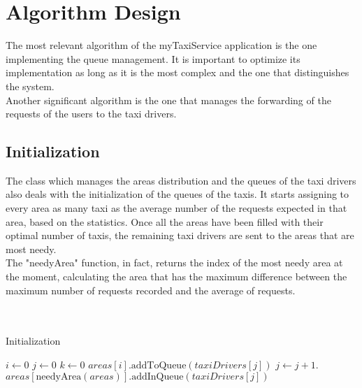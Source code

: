 
%
	\newpage
	
	\section{Algorithm Design}
		The most relevant algorithm of the myTaxiService application is the one implementing the queue management. It is important to optimize its implementation as long as it is the most complex and the one that distinguishes the system.\\
		Another significant algorithm is the one that manages the forwarding of the requests of the users to the taxi drivers.
		\subsection{Initialization} The class which manages the areas distribution and the queues of the taxi drivers also deals with the initialization of the queues of the taxis. It starts assigning to every area as many taxi as the average number of the requests expected in that area, based on the statistics. Once all the areas have been filled with their optimal number of taxis, the remaining taxi drivers are sent to the areas that are most needy.\\The "needyArea" function, in fact, returns the index of the most needy area at the moment, calculating the area that has the maximum difference between the maximum number of requests recorded and the average of requests.\\
			 \\\\
			
			\begin{algorithm}
				\caption{Initialization}
				\begin{algorithmic}[1]
					\State $i \gets \textit{0}$
					\State $j \gets \textit{0}$
						\State $k \gets \textit{0}$
								\State $areas[i].\text{addToQueue}(taxiDrivers[j])$
								\State $j \gets j+1$.
								\EndFor
						\EndFor
							\State $areas[\text{needyArea} (areas)].\text{addInQueue}(taxiDrivers[j])$
						\EndFor
					\EndIf
					\EndProcedure
				\end{algorithmic}
			\end{algorithm}
			
